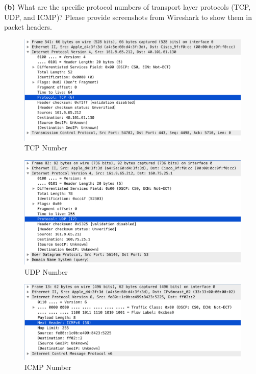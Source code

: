 \documentclass[11pt]{article}
\renewcommand\part[1]{\vspace{.10in}\textbf{(#1)}}
\begin{document}
	\part{b} What are the specific protocol numbers of transport layer protocols (TCP, UDP, and ICMP)? Please provide screenshots from Wireshark to show them in packet headers. \\
		
		\begin{figure}[H]
			\centering
			\includegraphics[width=0.9\linewidth]{tcp}
			\caption{TCP Number}
		\end{figure}
	
		\begin{figure}[H]
			\centering
			\includegraphics[width=0.9\linewidth]{udp}
			\caption{UDP Number}
		\end{figure}

		\begin{figure}[H]
			\centering
			\includegraphics[width=0.9\linewidth]{icmp}
			\caption{ICMP Number}
		\end{figure}
		
\end{document}
